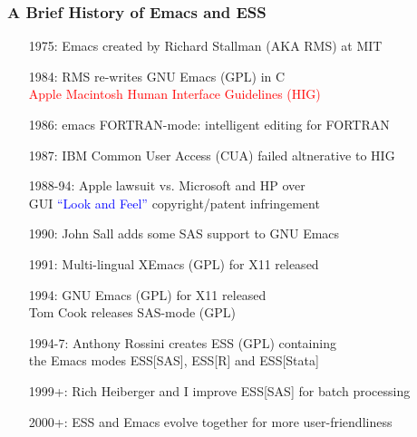 \documentclass[11pt,pdftex,dvipsnames,usenames,helvetica]{beamer}
\begin{document}
\begin{frame}
\frametitle{A Brief History of Emacs and ESS}
\begin{itemize}
\item[1975:] Emacs created by Richard Stallman (AKA RMS) at MIT 
\item[1984:] RMS re-writes GNU Emacs (GPL) in C \\ 
\textcolor{red}{Apple Macintosh Human Interface Guidelines (HIG)} 
\item[1986:] emacs FORTRAN-mode: intelligent editing for FORTRAN 
\item[1987:] IBM Common User Access (CUA) failed altnerative to HIG
\item[1988-94:] Apple lawsuit vs. Microsoft and HP over\\
 GUI \textcolor{blue}{``Look and Feel''} copyright/patent infringement 
\item[1990:] John Sall adds some SAS support to GNU Emacs 
\item[1991:] Multi-lingual XEmacs (GPL) for X11 released 
\item[1994:] GNU Emacs (GPL) for X11 released \\ 
Tom Cook releases SAS-mode (GPL) 
\item[1994-7:] Anthony Rossini creates ESS (GPL) containing\\
the Emacs modes ESS[SAS], ESS[R] and ESS[Stata] 
\item[1999+:] Rich Heiberger and I improve ESS[SAS] for batch processing 
\item[2000+:] ESS and Emacs evolve together for more user-friendliness
\end{itemize}
\end{frame}
\end{document}
